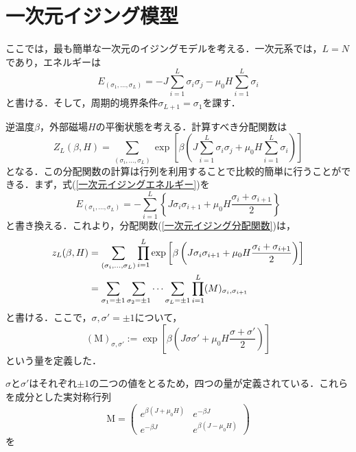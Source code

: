 \documentclass[a4paper,11pt]{jsreport}
\begin{document}
\section{一次元イジング模型}
ここでは，最も簡単な一次元のイジングモデルを考える．一次元系では，$L=N$であり，エネルギーは
\begin{equation}
  E_{(\sigma_1,\dots,\sigma_L)} = -J \sum_{i=1}^L \sigma_i \sigma_j - \mu_0 H \sum_{i=1}^L \sigma_i \label{一次元イジングエネルギー}
\end{equation}
と書ける．そして，周期的境界条件$\sigma_{L+1} = \sigma_{1}$を課す．\par
逆温度$\beta$，外部磁場$H$の平衡状態を考える．計算すべき分配関数は
\begin{equation}
  Z_L(\beta, H) = \sum_{(\sigma_i,\dots,\sigma_L)} \exp{\left[ \beta\left( J \sum_{i=1}^L \sigma_i \sigma_j + \mu_0 H \sum_{i=1}^L \sigma_i \right) \right]} \label{一次元イジング分配関数}
\end{equation}
となる．この分配関数の計算は行列を利用することで比較的簡単に行うことができる．まず，式(\ref{一次元イジングエネルギー})を
\begin{equation}
  E_{(\sigma_1,\dots,\sigma_L)} = -\sum_{i=1}^L \left\{ J\sigma_i \sigma_{i+1} + \mu_0 H \frac{\sigma_i + \sigma_{i+1}}{2} \right\}
\end{equation}
と書き換える．これより，分配関数(\ref{一次元イジング分配関数})は，
\begin{align}
  z_L(\beta,H)
   & = \sum_{(\sigma_i,\dots,\sigma_L)} \prod_{i=1}^L \exp{\left[ \beta \left( J \sigma_i \sigma_{i+1} + \mu_0 H \frac{\sigma_i + \sigma_{i+1}}{2}\right) \right]} \notag \\
   & = \sum_{\sigma_1=\pm{1}}\sum_{\sigma_2=\pm{1}}\cdots\sum_{\sigma_L=\pm{1}} \prod_{i=1}^L (M)_{\sigma_i, \sigma_{i+1}}
\end{align}
と書ける．ここで，$\sigma,\sigma'=\pm{1}$について，
\begin{equation}
  (\mathrm{M})_{\sigma,\sigma'} := \exp{\left[ \beta \left( J\sigma\sigma' + \mu_0 H \frac{\sigma+\sigma'}{2} \right) \right]}
\end{equation}
という量を定義した．\par
$\sigma$と$\sigma'$はそれぞれ$\pm{1}$の二つの値をとるため，四つの量が定義されている．これらを成分とした実対称行列
\begin{equation}
  \mathrm{M} =
  \begin{pmatrix}
    e^{\beta(J+\mu_0 H)} & e^{-\beta J}         \\
    e^{-\beta J}         & e^{\beta(J-\mu_0 H)}
  \end{pmatrix}
\end{equation}
を
\end{document}
